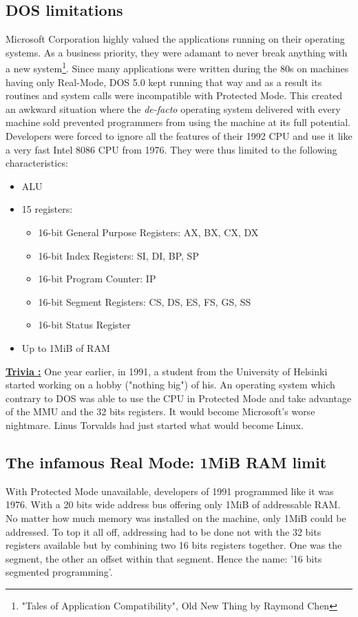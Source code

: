 \documentclass[book.tex]{subfiles}
\begin{document}
  \subsection{DOS limitations}
  Microsoft Corporation highly valued the applications running on their operating systems. As a business priority, they were adamant to never break anything with a new system\footnote{"Tales of Application Compatibility", Old New Thing by Raymond Chen}.  Since many applications were written during the 80s on machines having only Real-Mode, DOS 5.0 kept running that way and as a result its routines and system calls were incompatible with Protected Mode. This created an awkward situation where the \emph{de-facto} operating system delivered with every machine sold prevented programmers from using the machine at its full potential. Developers were forced to ignore all the features of their 1992 CPU and use it like a very fast Intel 8086 CPU from 1976. They were thus limited to the following characteristics: \\
\begin{itemize}
\item ALU
\item 15 registers:
\begin{itemize}
  \item 16-bit General Purpose Registers: AX, BX, CX, DX
  \item 16-bit Index Registers: SI, DI, BP, SP
  \item 16-bit Program Counter: IP
  \item 16-bit Segment Registers: CS, DS, ES, FS, GS, SS
  \item 16-bit Status Register
\end{itemize}
\item Up to 1MiB of RAM
\end{itemize}


\bigskip

 \textbf{\underline{Trivia :}} One year earlier, in 1991, a student from the University of Helsinki started working on a hobby ("nothing big") of his. An operating system which contrary to DOS was able to use the CPU in Protected Mode and take advantage of the MMU and the 32 bits registers. It would become Microsoft's worse nightmare. Linus Torvalds had just started what would become Linux.



  \subsection{The infamous Real Mode: 1MiB RAM limit}
  With Protected Mode unavailable, developers of 1991 programmed like it was 1976. With a 20 bits wide address bus offering only 1MiB of addressable RAM. No matter how much memory was installed on the machine, only 1MiB could be addressed. To top it all off, addressing had to be done not with the 32 bits registers available but by combining two 16 bits registers together. One was the segment, the other an offset within that segment. Hence the name: '16 bits segmented programming'.
\end{document}
